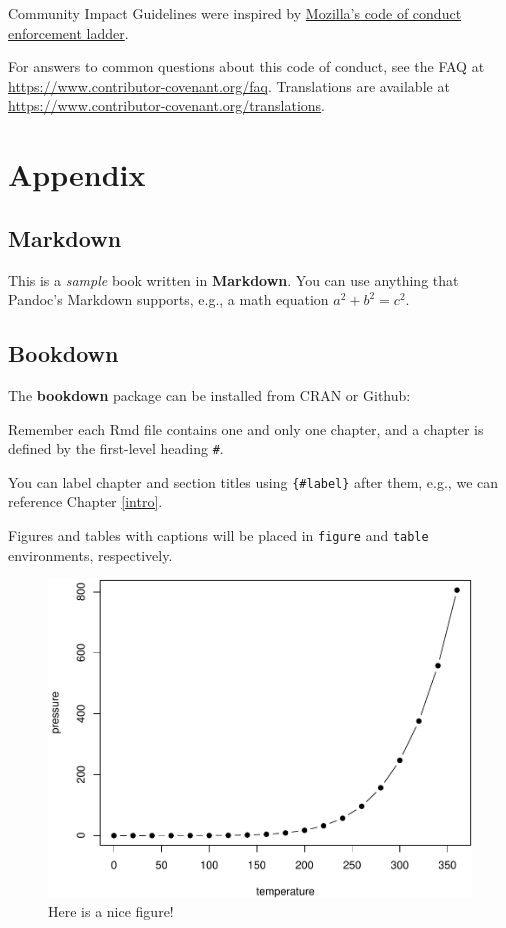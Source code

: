 \documentclass[
  fontsize=13pt,
  english,
  a4paper,
  openany, a4paper, oneside]{book}
\begin{document}
Community Impact Guidelines were inspired by
\href{https://github.com/mozilla/diversity}{Mozilla's code of conduct enforcement ladder}.

For answers to common questions about this code of conduct, see the FAQ at
\url{https://www.contributor-covenant.org/faq}. Translations are available
at \url{https://www.contributor-covenant.org/translations}.

\hypertarget{appendix}{%
\chapter{Appendix}\label{appendix}}

\hypertarget{markdown-1}{%
\section{Markdown}\label{markdown-1}}

This is a \emph{sample} book written in \textbf{Markdown}. You can use anything that Pandoc's Markdown supports, e.g., a math equation \(a^2 + b^2 = c^2\).

\hypertarget{bookdown}{%
\section{Bookdown}\label{bookdown}}

The \textbf{bookdown} package can be installed from CRAN or Github:

Remember each Rmd file contains one and only one chapter, and a chapter is defined by the first-level heading \texttt{\#}.

You can label chapter and section titles using \texttt{\{\#label\}} after them, e.g., we can reference Chapter \ref{intro}.

Figures and tables with captions will be placed in \texttt{figure} and \texttt{table} environments, respectively.

\begin{figure}

{\centering \includegraphics[width=0.8\linewidth]{reprex_collaboration_guide_files/figure-latex/nice-fig-1} 

}

\caption{Here is a nice figure!}\label{fig:nice-fig}
\end{figure}
\end{document}
